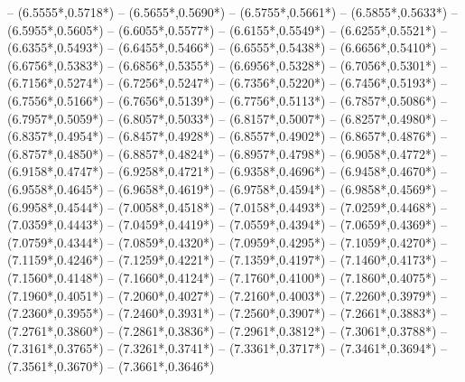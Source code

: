 {	-- ({6.5555*\dx},{0.5718*\dy})
	-- ({6.5655*\dx},{0.5690*\dy})
	-- ({6.5755*\dx},{0.5661*\dy})
	-- ({6.5855*\dx},{0.5633*\dy})
	-- ({6.5955*\dx},{0.5605*\dy})
	-- ({6.6055*\dx},{0.5577*\dy})
	-- ({6.6155*\dx},{0.5549*\dy})
	-- ({6.6255*\dx},{0.5521*\dy})
	-- ({6.6355*\dx},{0.5493*\dy})
	-- ({6.6455*\dx},{0.5466*\dy})
	-- ({6.6555*\dx},{0.5438*\dy})
	-- ({6.6656*\dx},{0.5410*\dy})
	-- ({6.6756*\dx},{0.5383*\dy})
	-- ({6.6856*\dx},{0.5355*\dy})
	-- ({6.6956*\dx},{0.5328*\dy})
	-- ({6.7056*\dx},{0.5301*\dy})
	-- ({6.7156*\dx},{0.5274*\dy})
	-- ({6.7256*\dx},{0.5247*\dy})
	-- ({6.7356*\dx},{0.5220*\dy})
	-- ({6.7456*\dx},{0.5193*\dy})
	-- ({6.7556*\dx},{0.5166*\dy})
	-- ({6.7656*\dx},{0.5139*\dy})
	-- ({6.7756*\dx},{0.5113*\dy})
	-- ({6.7857*\dx},{0.5086*\dy})
	-- ({6.7957*\dx},{0.5059*\dy})
	-- ({6.8057*\dx},{0.5033*\dy})
	-- ({6.8157*\dx},{0.5007*\dy})
	-- ({6.8257*\dx},{0.4980*\dy})
	-- ({6.8357*\dx},{0.4954*\dy})
	-- ({6.8457*\dx},{0.4928*\dy})
	-- ({6.8557*\dx},{0.4902*\dy})
	-- ({6.8657*\dx},{0.4876*\dy})
	-- ({6.8757*\dx},{0.4850*\dy})
	-- ({6.8857*\dx},{0.4824*\dy})
	-- ({6.8957*\dx},{0.4798*\dy})
	-- ({6.9058*\dx},{0.4772*\dy})
	-- ({6.9158*\dx},{0.4747*\dy})
	-- ({6.9258*\dx},{0.4721*\dy})
	-- ({6.9358*\dx},{0.4696*\dy})
	-- ({6.9458*\dx},{0.4670*\dy})
	-- ({6.9558*\dx},{0.4645*\dy})
	-- ({6.9658*\dx},{0.4619*\dy})
	-- ({6.9758*\dx},{0.4594*\dy})
	-- ({6.9858*\dx},{0.4569*\dy})
	-- ({6.9958*\dx},{0.4544*\dy})
	-- ({7.0058*\dx},{0.4518*\dy})
	-- ({7.0158*\dx},{0.4493*\dy})
	-- ({7.0259*\dx},{0.4468*\dy})
	-- ({7.0359*\dx},{0.4443*\dy})
	-- ({7.0459*\dx},{0.4419*\dy})
	-- ({7.0559*\dx},{0.4394*\dy})
	-- ({7.0659*\dx},{0.4369*\dy})
	-- ({7.0759*\dx},{0.4344*\dy})
	-- ({7.0859*\dx},{0.4320*\dy})
	-- ({7.0959*\dx},{0.4295*\dy})
	-- ({7.1059*\dx},{0.4270*\dy})
	-- ({7.1159*\dx},{0.4246*\dy})
	-- ({7.1259*\dx},{0.4221*\dy})
	-- ({7.1359*\dx},{0.4197*\dy})
	-- ({7.1460*\dx},{0.4173*\dy})
	-- ({7.1560*\dx},{0.4148*\dy})
	-- ({7.1660*\dx},{0.4124*\dy})
	-- ({7.1760*\dx},{0.4100*\dy})
	-- ({7.1860*\dx},{0.4075*\dy})
	-- ({7.1960*\dx},{0.4051*\dy})
	-- ({7.2060*\dx},{0.4027*\dy})
	-- ({7.2160*\dx},{0.4003*\dy})
	-- ({7.2260*\dx},{0.3979*\dy})
	-- ({7.2360*\dx},{0.3955*\dy})
	-- ({7.2460*\dx},{0.3931*\dy})
	-- ({7.2560*\dx},{0.3907*\dy})
	-- ({7.2661*\dx},{0.3883*\dy})
	-- ({7.2761*\dx},{0.3860*\dy})
	-- ({7.2861*\dx},{0.3836*\dy})
	-- ({7.2961*\dx},{0.3812*\dy})
	-- ({7.3061*\dx},{0.3788*\dy})
	-- ({7.3161*\dx},{0.3765*\dy})
	-- ({7.3261*\dx},{0.3741*\dy})
	-- ({7.3361*\dx},{0.3717*\dy})
	-- ({7.3461*\dx},{0.3694*\dy})
	-- ({7.3561*\dx},{0.3670*\dy})
	-- ({7.3661*\dx},{0.3646*\dy})
}
